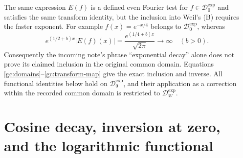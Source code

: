 \documentclass[11pt]{article}
\begin{document}
The same expression $E(f)$ is a defined even Fourier test for
$f\in\mathcal D_0^{\exp}$ and satisfies the same transform identity,
but the inclusion into Weil's (B) requires the faster exponent.
For example $f(x)=e^{-x/4}$ belongs to $\mathcal D_0^{\exp}$, whereas
\begin{equation}
 e^{(1/2+b)x}|E(f)(x)|
   =\frac{e^{(1/4+b)x}}{\sqrt{2\pi}}\longrightarrow\infty
   \quad (b>0).
 \label{gc:domain-counterexample}
\end{equation}
Consequently the incoming note's phrase ``exponential decay'' alone does
not prove its claimed inclusion in the original common domain.  Equations
\eqref{gc:domains}--\eqref{gc:transform-map} give the exact inclusion and
inverse.  All functional identities below hold on
$\mathcal D_0^{\exp}$, and their application as a correction within the
recorded common domain is restricted to $\mathcal D_W^{\exp}$.

\section{Cosine decay, inversion at zero, and the logarithmic functional}
\end{document}
